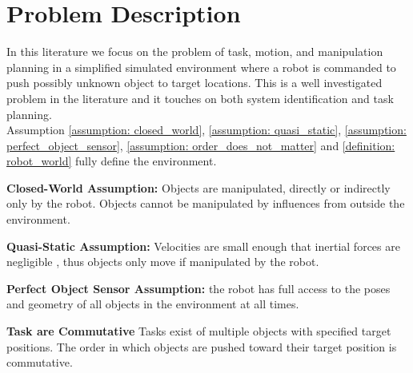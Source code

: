 \section{Problem Description}
\label{section: problem_description}
In this literature we focus on the problem of task, motion, and manipulation planning in a simplified simulated environment where a robot is commanded to push possibly unknown object to target locations. This is a well investigated problem in the literature \cite{sabbagh_novin_model_2021,wang_affordance-based_2020,scholz_navigation_2016,siciliano_path_2009, goldberg_asymptotically_2020} and it touches on both system identification and task planning.\\
    
Assumption \ref{assumption: closed_world}, \ref{assumption: quasi_static}, \ref{assumption: perfect_object_sensor}, \ref{assumption: order_does_not_matter} and \cref{definition: robot_world} fully define the environment. \\

\begin{assumption}
\label{assumption: closed_world}
\textbf{Closed-World Assumption:} Objects are manipulated, directly or indirectly only by the robot. Objects cannot be manipulated by influences from outside the environment.
\end{assumption}

\begin{assumption}
\label{assumption: quasi_static}
\textbf{Quasi-Static Assumption:} Velocities are small enough that inertial forces are negligible \cite{stuber_lets_2020}, thus objects only move if manipulated by the robot.
\end{assumption}

\begin{assumption}
\label{assumption: perfect_object_sensor}
\textbf{Perfect Object Sensor Assumption:} the robot has full access to the poses and geometry of all objects in the environment at all times.
\end{assumption}

\begin{assumption}
\label{assumption: order_does_not_matter}
\textbf{Task are Commutative} Tasks exist of multiple objects with specified target positions. The order in which objects are pushed toward their target position is commutative.
\end{assumption}

